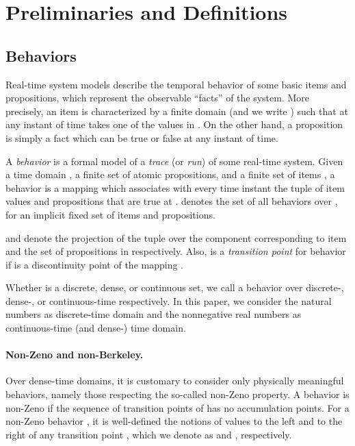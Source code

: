 \documentclass[a4paper]{article}
\theoremstyle{plain}
\theoremstyle{definition}
\begin{document}
\section{Preliminaries and Definitions} \label{sec:preliminaries}

\subsection{Behaviors}
Real-time system models describe the temporal behavior of some basic items and propositions, which represent the observable ``facts'' of the system.
More precisely, an item  is characterized by a finite domain  (and we write ) such that at any instant of time  takes one of the values in .
On the other hand, a proposition  is simply a fact which can be true or false at any instant of time.

A \emph{behavior} is a formal model of a \emph{trace} (or \emph{run}) of some real-time system.
Given a time domain , a finite set  of atomic propositions, and a finite set of items , a behavior  is a mapping  which associates with every time instant  the tuple  of item values and propositions that are true at .
 denotes the set of all behaviors over , for an implicit fixed set of items and propositions.

 and  denote the projection of the tuple  over the component corresponding to item  and the set of propositions in  respectively.
Also,  is a \emph{transition point} for behavior  if  is a discontinuity point of the mapping .

Whether  is a discrete, dense, or continuous set, we call a behavior over  discrete-, dense-, or continuous-time respectively.
In this paper, we consider the natural numbers  as discrete-time domain and the nonnegative real numbers  as continuous-time (and dense-) time domain.




\paragraph{Non-Zeno and non-Berkeley.}
Over dense-time domains, it is customary to consider only physically meaningful behaviors, namely those respecting the so-called non-Zeno property.
A behavior  is non-Zeno if the sequence of transition points of  has no accumulation points.
For a non-Zeno behavior , it is well-defined the notions of values to the left and to the right of any transition point , which we denote as  and , respectively.
\end{document}
